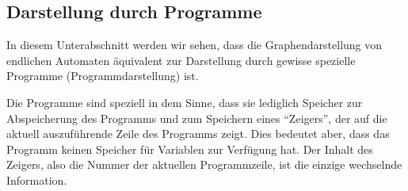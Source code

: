 \subsection{Darstellung durch Programme}\label{subsec:Programmdarstellung}
In diesem Unterabschnitt werden wir sehen, dass die Graphendarstellung von endlichen Automaten äquivalent zur Darstellung durch gewisse spezielle Programme (Programmdarstellung) ist.

Die Programme sind speziell in dem Sinne, dass sie lediglich Speicher zur Abspeicherung des Programms und zum Speichern eines \enquote{Zeigers}, der auf die aktuell auszuführende Zeile des Programms zeigt. Dies bedeutet aber, dass das Programm keinen Speicher für Variablen zur Verfügung hat. Der Inhalt des Zeigers, also die Nummer der aktuellen Programmzeile, ist die einzige wechselnde Information.

